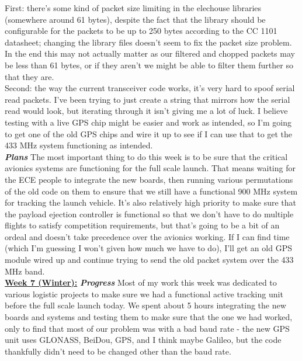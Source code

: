\documentclass[onecolumn, draftclsnofoot, 10pt, compsoc]{IEEEtran}
\begin{document}
First: there's some kind of packet size limiting in the elechouse libraries (somewhere around 61 bytes), despite the fact that the library should be configurable for the packets to be up to 250 bytes according to the CC 1101 datasheet; changing the library files doesn't seem to fix the packet size problem. In the end this may not actually matter as our filtered and chopped packets may be less than 61 bytes, or if they aren't we might be able to filter them further so that they are. \\

Second: the way the current transceiver code works, it's very hard to spoof serial read packets. I've been trying to just create a string that mirrors how the serial read would look, but iterating through it isn't giving me a lot of luck. I believe testing with a live GPS chip might be easier and work as intended, so I'm going to get one of the old GPS chips and wire it up to see if I can use that to get the 433 MHz system functioning as intended. \\

\textbf{\textit{{Plans}}}
\newline The most important thing to do this week is to be sure that the critical avionics systems are functioning for the full scale launch. That means waiting for the ECE people to integrate the new boards, then running various permutations of the old code on them to ensure that we still have a functional 900 MHz system for tracking the launch vehicle. It's also relatively high priority to make sure that the payload ejection controller is functional so that we don't have to do multiple flights to satisfy competition requirements, but that's going to be a bit of an ordeal and doesn't take precedence over the avionics working. If I can find time (which I'm guessing I won't given how much we have to do), I'll get an old GPS module wired up and continue trying to send the old packet system over the 433 MHz band. \\

\underline{\textbf{Week 7 (Winter):}}
\newline\textbf{\textit{{Progress}}}
\newline Most of my work this week was dedicated to various logistic projects to make sure we had a functional active tracking unit before the full scale launch today. We spent about 5 hours integrating the new boards and systems and testing them to make sure that the one we had worked, only to find that most of our problem was with a bad baud rate - the new GPS unit uses GLONASS, BeiDou, GPS, and I think maybe Galileo, but the code thankfully didn't need to be changed other than the baud rate. \\
\end{document}
